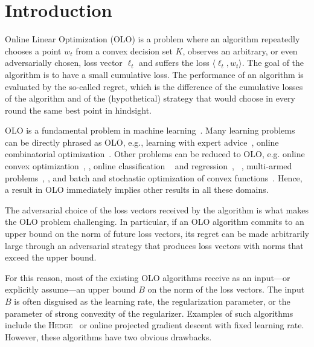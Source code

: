 \section{Introduction}
\label{section:introduction}

Online Linear Optimization (OLO) is a problem where an algorithm repeatedly
chooses a point $w_t$ from a convex decision set $K$, observes an arbitrary, or
even adversarially chosen, loss vector $\ell_t$ and suffers the loss $\langle
\ell_t, w_t \rangle$.  The goal of the algorithm is to have a small cumulative
loss. The performance of an algorithm is evaluated by the so-called regret,
which is the difference of the cumulative losses of the algorithm and of the
(hypothetical) strategy that would choose in every round the same best point in
hindsight.

OLO is a fundamental problem in machine
learning~\cite{Cesa-Bianchi-Lugosi-2006, Rakhlin-Sridharan-2009,
Shalev-Shwartz-2011}.  Many learning problems can be directly phrased as OLO,
e.g., learning with expert advice~\cite{Littlestone-Warmuth-1994, Vovk-1998,
Freund-Schapire-1997, Cesa-Bianchi-Haussler-Helmbold-Schapire-Warmuth-1997},
online combinatorial optimization~\cite{Kalai-Vempala-2005,
Helmbold-Warmuth-2009, Koolen-Warmuth-Kivinen-2010}. Other problems can be
reduced to OLO, e.g. online convex
optimization~\cite{Abernethy-Bartlett-Rakhlin-Tewari-2008},
\cite[Chapter~2]{Shalev-Shwartz-2011}, online classification
~\cite{Rosenblatt-1958, Freund-Schapire-1999} and
regression~\cite{Kivinen-Warmuth-1997},
~\cite[Chapters~11~and~12]{Cesa-Bianchi-Lugosi-2006}, multi-armed
problems~\cite[Chapter~6]{Cesa-Bianchi-Lugosi-2006},
\cite{Abernethy-Hazan-Rakhlin-2008, Bubeck-Cesa-Bianchi-2012}, and batch and
stochastic optimization of convex functions~\cite{Nemirovski-Yudin-1983,
Bubeck-2015}.  Hence, a result in OLO immediately implies other results in all
these domains.

The adversarial choice of the loss vectors received by the algorithm is what
makes the OLO problem challenging. In particular, if an OLO algorithm commits
to an upper bound on the norm of future loss vectors, its regret can be made
arbitrarily large through an adversarial strategy that produces loss vectors
with norms that exceed the upper bound.

For this reason, most of the existing OLO algorithms receive as an input---or
explicitly assume---an upper bound $B$ on the norm of the loss vectors.  The
input $B$ is often disguised as the learning rate, the regularization
parameter, or the parameter of strong convexity of the regularizer. Examples of
such algorithms include the \textsc{Hedge}~\cite{Freund-Schapire-1997} or
online projected gradient descent with fixed learning rate.  However, these
algorithms have two obvious drawbacks.

